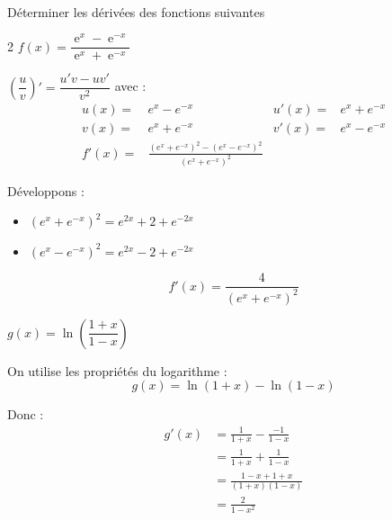 \documentclass[11pt,a4paper]{article}
\DeclareMathOperator{\e}{e}
\newcommand{\cor}[1]{%
\begin{tcolorbox}[colback=red!5!white,colframe=red!75!black]
#1
\end{tcolorbox}
}
\begin{document}
\\[5 pt]
Déterminer les dérivées des fonctions suivantes
\begin{multicols}{2}
$f(x)=\dfrac{\e^x-\e^{-x}}{\e^x+\e^{-x}}$
\vfill
\cor{
$\left(\dfrac{u}{v}\right)' = \dfrac{u'v - uv'}{v^2}$ avec :
\begin{align*}
u(x) = & e^x - e^{-x} & u'(x) = & e^x + e^{-x} \\
v(x) = & e^x + e^{-x} & v'(x) = & e^x - e^{-x} \\
f'(x) = & \frac{(e^x + e^{-x})^2 - (e^x - e^{-x})^2}{(e^x + e^{-x})^2}
\end{align*}

Développons :
\begin{itemize}
\item $(e^x + e^{-x})^2 = e^{2x} + 2 + e^{-2x}$
\item $(e^x - e^{-x})^2 = e^{2x} - 2 + e^{-2x}$
\end{itemize}

$$f'(x) = \frac{4}{(e^x + e^{-x})^2}$$
}

$g(x)= \ln\left(\dfrac{1+x}{1-x}\right)$
\cor{
On utilise les propriétés du logarithme :
$$g(x) = \ln(1+x) - \ln(1-x)$$

Donc :
\begin{align*}
g'(x) &= \frac{1}{1+x} - \frac{-1}{1-x} \\
&= \frac{1}{1+x} + \frac{1}{1-x} \\
&= \frac{1-x + 1+x}{(1+x)(1-x)} \\
&= \frac{2}{1-x^2}
\end{align*}
}

\end{multicols}

\newpage
\end{document}
